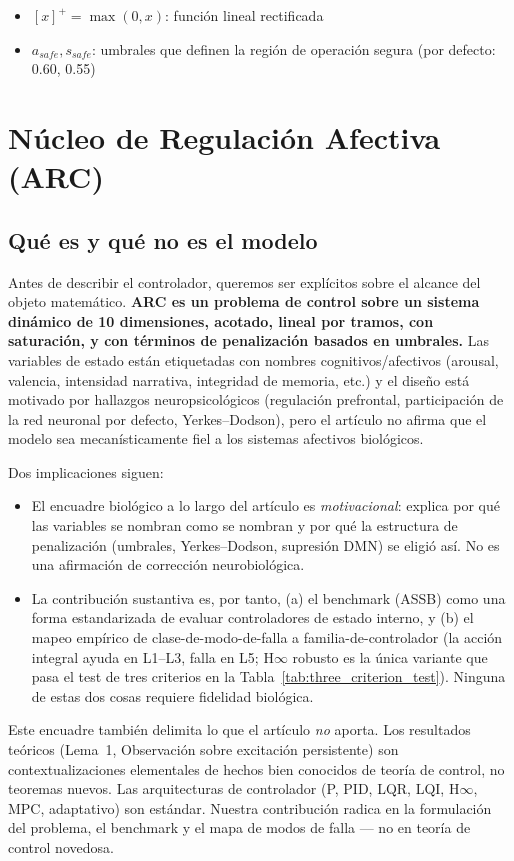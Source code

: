 \documentclass{article}
\begin{document}
\begin{itemize}
    \item $[x]^+ = \max(0, x)$: función lineal rectificada
    \item $a_{safe}, s_{safe}$: umbrales que definen la región de operación segura (por defecto: 0.60, 0.55)
\end{itemize}

\section{Núcleo de Regulación Afectiva (ARC)}

\subsection{Qué es y qué no es el modelo}

Antes de describir el controlador, queremos ser explícitos sobre el alcance del objeto matemático. \textbf{ARC es un problema de control sobre un sistema dinámico de 10 dimensiones, acotado, lineal por tramos, con saturación, y con términos de penalización basados en umbrales.} Las variables de estado están etiquetadas con nombres cognitivos/afectivos (arousal, valencia, intensidad narrativa, integridad de memoria, etc.) y el diseño está motivado por hallazgos neuropsicológicos (regulación prefrontal, participación de la red neuronal por defecto, Yerkes--Dodson), pero el artículo no afirma que el modelo sea mecanísticamente fiel a los sistemas afectivos biológicos.

Dos implicaciones siguen:
\begin{itemize}
    \item El encuadre biológico a lo largo del artículo es \emph{motivacional}: explica por qué las variables se nombran como se nombran y por qué la estructura de penalización (umbrales, Yerkes--Dodson, supresión DMN) se eligió así. No es una afirmación de corrección neurobiológica.
    \item La contribución sustantiva es, por tanto, (a) el benchmark (ASSB) como una forma estandarizada de evaluar controladores de estado interno, y (b) el mapeo empírico de clase-de-modo-de-falla a familia-de-controlador (la acción integral ayuda en L1--L3, falla en L5; H$\infty$ robusto es la única variante que pasa el test de tres criterios en la Tabla~\ref{tab:three_criterion_test}). Ninguna de estas dos cosas requiere fidelidad biológica.
\end{itemize}

Este encuadre también delimita lo que el artículo \emph{no} aporta. Los resultados teóricos (Lema~1, Observación sobre excitación persistente) son contextualizaciones elementales de hechos bien conocidos de teoría de control, no teoremas nuevos. Las arquitecturas de controlador (P, PID, LQR, LQI, H$\infty$, MPC, adaptativo) son estándar. Nuestra contribución radica en la formulación del problema, el benchmark y el mapa de modos de falla --- no en teoría de control novedosa.
\end{document}
